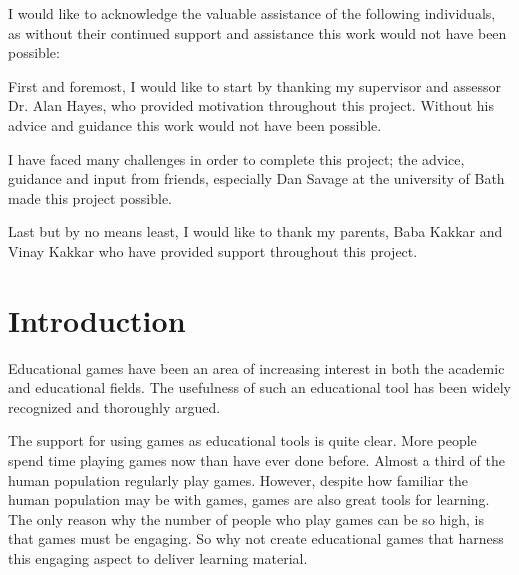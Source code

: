 \documentclass[a4paper,11.5pt]{report}
\makeatletter
\numberwithin{figure}{section}
\numberwithin{table}{section}
\numberwithin{equation}{section}
\numberwithin{equation}{section}
\newcommand\mainmatter{%
    \cleardoublepage
  \pagenumbering{arabic}}
\newcommand\blankpage{%
    \null
    \thispagestyle{empty}%
    \addtocounter{page}{-1}%
    \newpage}
\makeatother
\begin{document}
I would like to acknowledge the valuable assistance of the following individuals, as without their continued support and assistance this work would not have been possible:

First and foremost, I would like to start by thanking my supervisor and assessor Dr. Alan Hayes, who provided motivation throughout this project. Without his advice and guidance this work would not have been possible.

I have faced many challenges in order to complete this project; the advice, guidance and input from friends, especially Dan Savage at the university of Bath made this project possible.

Last but by no means least, I would like to thank my parents, Baba Kakkar and Vinay Kakkar who have provided support throughout this project.
 
\afterpage{\blankpage}

\mainmatter

\chapter{Introduction}


Educational games have been an area of increasing interest in both the academic and educational fields. The usefulness of such an educational tool has been widely recognized and thoroughly argued. 


The support for using games as educational tools is quite clear. More people spend time playing games now than have ever done before. Almost a third of the human population regularly play games. However, despite how familiar the human population may be with games, games are also great tools for learning. The only reason why the number of people who play games can be so high, is that games must be engaging. So why not create educational games that harness this engaging aspect to deliver learning material. 
\end{document}
